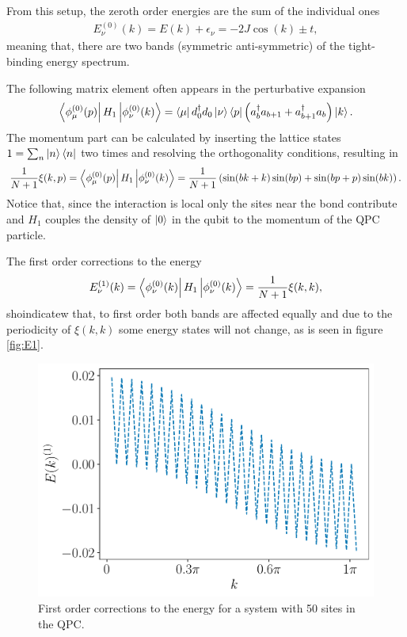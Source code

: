 \documentclass{article}
\begin{document}
From this setup, the zeroth order energies are the sum of the individual ones
\begin{align}
   E^{(0)}_{\nu}(k) = E(k) + \epsilon_\nu = -2J\cos(k)\pm t,
\end{align}
meaning that, there are two bands (symmetric anti-symmetric) of the tight-binding energy spectrum.

The following matrix element often appears in the perturbative expansion
\begin{align}
    \bra{\phi^{(0)}_\mu (p)}H_1 \ket{\phi^{(0)}_\nu (k)} = \bra{\mu}d^\dagger_0 d_0 \ket{\nu} \bra{p}\left( a_{b}^{\dagger}a_{b+1} + a^{\dagger}_{b+1}a_{b}  \right) \ket{k}.
\end{align}
The momentum part can be calculated by inserting the lattice states $1 = \sum_{n} \ket{n}\bra{n}$ two times and resolving the orthogonality conditions, resulting in
\begin{align}
   \frac{1}{N+1} \xi(k,p) = \bra{\phi^{(0)}_\mu (p)}H_1 \ket{\phi^{(0)}_\nu (k)} = \frac{1}{N+1} \left(  \sin(bk+k)\sin(bp)+ \sin(bp+p)\sin(bk)\right) .
\end{align}
Notice that, since the interaction is local only the sites near the bond contribute and $H_1$ couples the density of $\ket{0}$ in the qubit to the momentum of the QPC particle.

The first order corrections to the energy
\begin{align}
    E_{\nu}^{(1)}(k) = \bra{\phi^{(0)}_\nu (k)}H_1 \ket{\phi^{(0)}_\nu (k)} = \frac{1}{N+1} \xi(k,k),
\end{align}
shoindicatew that, to first order both bands are affected equally and due to the periodicity of 
$\xi(k,k)$ some energy states will not change, as is seen in figure \ref{fig:E1}.

\begin{figure}[h!]
    \centering
        \includegraphics[width=0.5\linewidth]{figures/report_07_2025/E1_corr=50_Omega=0.5_t=0.4.pdf}
        \caption{First order corrections to the energy for a system with 50 sites in the QPC.}
\end{figure}\label{fig:E1}
\end{document}

